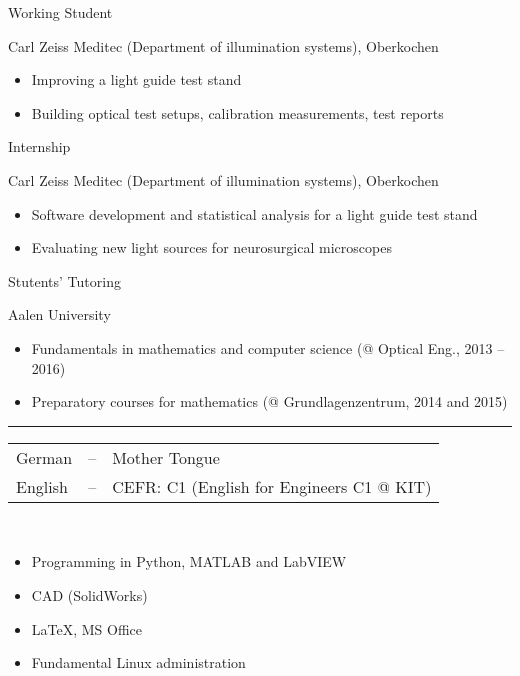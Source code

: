 \documentclass[a4paper,10pt]{article}
\newlength{\cvcolumngapwidth}
\newlength{\cvleftcolumnwidth}
\newlength{\cvrightcolumnwidth}
\newcommand{\cvsectionstyle}[1]{{\normalsize\textcolor{cvsectioncolor}{#1}}}
\newcommand{\cvtitlestyle}[1]{{\large\textcolor{cvtitlecolor}{#1}}}
\newcommand{\cvdurationstyle}[1]{{\small\textcolor{cvdurationcolor}{#1}}}
\newcommand{\cvheadingstyle}[1]{{\normalsize\textcolor{cvheadingcolor}{#1}}}
\newlength{\cvafteritemskipamount}
\newlength{\cvaftersectionskipamount}
\newlength{\cvbetweensectionandheadingextraskipamount}
\newlength{\cvaftertitleskipamount}
\newlength{\cvparskip}
\newcommand{\cvsection}[1]{
    \begin{minipage}[t][][b]{\cvleftcolumnwidth}
        \raggedleft\cvsectionstyle{#1}
    \end{minipage}%
    \hspace{\cvcolumngapwidth}%
    \begin{minipage}[t]{\cvrightcolumnwidth}
        \textcolor{cvrulecolor}{\rule{\cvrightcolumnwidth}{0.3mm}}
    \end{minipage}

    \vspace{\cvaftersectionskipamount}
}
\newcommand{\cvitem}[2]{
    \begin{minipage}[t]{\cvleftcolumnwidth}
    \strut\vspace*{-\baselineskip}\newline %
    \raggedleft #1
    \end{minipage}%
    \hspace{\cvcolumngapwidth}%
    \begin{minipage}[t]{\cvrightcolumnwidth}
        \setlength{\parskip}{\cvparskip}
        \strut\vspace*{-\baselineskip}\newline #2 %
    \end{minipage}

    \vspace{\cvafteritemskipamount}
}
\newcommand{\cvtitle}[1]{
    \cvtitlestyle{#1}

    \vspace{\cvaftertitleskipamount}
    \vspace{-\cvparskip}
}
\begin{document}
\cvitem{\cvdurationstyle{March 2015 -- July 2015}}{\cvtitle{Working Student}
    Carl Zeiss Meditec (Department of illumination systems), Oberkochen
    \begin{itemize}[leftmargin=*]
        \item Improving a light guide test stand
        \item Building optical test setups, calibration measurements, test reports
    \end{itemize}
}

\cvitem{\cvdurationstyle{September 2014 -- February 2015}}{\cvtitle{Internship}
    Carl Zeiss Meditec (Department of illumination systems), Oberkochen
    \begin{itemize}[leftmargin=*]
        \item Software development and statistical analysis for a light guide test stand
        \item Evaluating new light sources for neurosurgical microscopes 
    \end{itemize}
}

\cvitem{\cvdurationstyle{2013 -- 2016}}{\cvtitle{Stutents' Tutoring}
    Aalen University
    \begin{itemize}[leftmargin=*]
        \item Fundamentals in mathematics and computer science (@ Optical Eng., 2013 -- 2016)
        \item Preparatory courses for mathematics (@ Grundlagenzentrum, 2014 and 2015)
    \end{itemize}
}

\cvsection{SKILLS}

\cvitem{\cvheadingstyle{Languages}}{
    \hspace*{-2mm}\begin{tabular}{lcl}
    German  & -- & Mother Tongue \\
    English & -- & CEFR: C1 (English for Engineers C1 @  KIT) \\
    \end{tabular}
}

\cvitem{\cvheadingstyle{Computer skills}}{
    \\[-5.5ex]\begin{itemize}[leftmargin=*]
    	\item Programming in Python, MATLAB and LabVIEW
    	\item CAD (SolidWorks)
    	\item \LaTeX, MS Office
    	\item Fundamental Linux administration
    \end{itemize}
}
\end{document}
